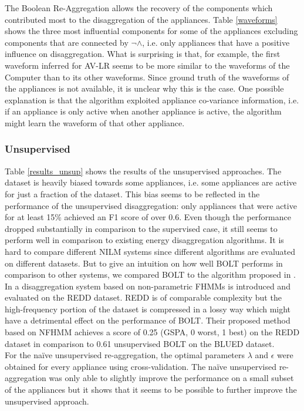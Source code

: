 The Boolean Re-Aggregation allows the recovery of the components which contributed most to the disaggregation of the appliances. Table \ref{waveforms} shows the three most influential components for some of the appliances excluding components that are connected by $\neg \land$, i.e. only appliances that have a positive influence on disaggregation. What is surprising is that, for example, the first waveform inferred for AV-LR seems to be more similar to the waveforms of the Computer than to its other waveforms. Since ground truth of the waveforms of the appliances is not available, it is unclear why this is the case. One possible explanation is that the algorithm exploited appliance co-variance information, i.e. if an appliance is only active when another appliance is active, the algorithm might learn the waveform of that other appliance.

\subsubsection{Unsupervised}
Table \ref{results_unsup} shows the results of the unsupervised approaches. The dataset is heavily biased towards some appliances, i.e. some appliances are active for just a fraction of the dataset. This bias seems to be reflected in the performance of the unsupervised disaggregation: only appliances that were active for at least 15\% achieved an F1 score of over 0.6. Even though the performance dropped substantially in comparison to the supervised case, it still seems to perform well in comparison to existing energy disaggregation algorithms. It is hard to compare different NILM systems since different algorithms are evaluated on different datasets. But to give an intuition on how well BOLT performs in comparison to other systems, we compared BOLT to the algorithm proposed in \cite{jiafully}. In \cite{jiafully} a disaggregation system based on non-parametric FHMMs is introduced and evaluated on the REDD \cite{kolter2011redd} dataset. REDD is of comparable complexity but the high-frequency portion of the dataset is compressed in a lossy way which might have a detrimental effect on the performance of BOLT. Their proposed method based on NFHMM achieves a score of 0.25 (GSPA, 0 worst, 1 best) on the REDD dataset in comparison to 0.61 unsupervised BOLT on the BLUED dataset.\\
For the na\"ive unsupervised re-aggregation, the optimal parameters $\lambda$ and $\epsilon$ were obtained for every appliance using cross-validation. The na\"ive unsupervised re-aggregation was only able to slightly improve the performance on a small subset of the appliances but it shows that it seems to be possible to further improve the unsupervised approach.


